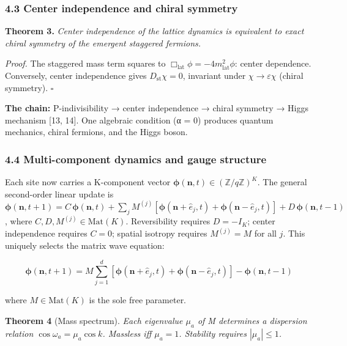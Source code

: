\documentclass[
]{article}
\begin{document}
\hypertarget{center-independence-and-chiral-symmetry}{%
\subsubsection{4.3 Center independence and chiral
symmetry}\label{center-independence-and-chiral-symmetry}}

\textbf{Theorem 3.} \emph{Center independence of the lattice dynamics is
equivalent to exact chiral symmetry of the emergent staggered fermions.}

\emph{Proof.} The staggered mass term squares to
\(\Box_{\text{lat}}\phi = -4m_{\text{lat}}^2\phi\): center dependence.
Conversely, center independence gives \(D_{\text{st}}\chi = 0\),
invariant under \(\chi \to \varepsilon\chi\) (chiral symmetry).
\(\square\)

\textbf{The chain:} P-indivisibility → center independence → chiral
symmetry → Higgs mechanism {[}13, 14{]}. One algebraic condition (α = 0)
produces quantum mechanics, chiral fermions, and the Higgs boson.

\hypertarget{multi-component-dynamics-and-gauge-structure}{%
\subsubsection{4.4 Multi-component dynamics and gauge
structure}\label{multi-component-dynamics-and-gauge-structure}}

Each site now carries a K-component vector
\(\boldsymbol{\phi}(\mathbf{n}, t) \in (\mathbb{Z}/q\mathbb{Z})^K\). The
general second-order linear update is
\(\boldsymbol{\phi}(\mathbf{n}, t+1) = C\,\boldsymbol{\phi}(\mathbf{n}, t) + \sum_j M^{(j)}[\boldsymbol{\phi}(\mathbf{n}+\hat{e}_j, t) + \boldsymbol{\phi}(\mathbf{n}-\hat{e}_j, t)] + D\,\boldsymbol{\phi}(\mathbf{n}, t-1)\),
where \(C, D, M^{(j)} \in \mathrm{Mat}(K)\). Reversibility requires
\(D = -I_K\); center independence requires \(C = 0\); spatial isotropy
requires \(M^{(j)} = M\) for all \(j\). This uniquely selects the matrix
wave equation:

\[\boldsymbol{\phi}(\mathbf{n}, t+1) = M \sum_{j=1}^{d} \left[\boldsymbol{\phi}(\mathbf{n} + \hat{e}_j, t) + \boldsymbol{\phi}(\mathbf{n} - \hat{e}_j, t)\right] - \boldsymbol{\phi}(\mathbf{n}, t-1)\]

where \(M \in \mathrm{Mat}(K)\) is the sole free parameter.

\textbf{Theorem 4} (Mass spectrum). \emph{Each eigenvalue \(\mu_a\) of M
determines a dispersion relation \(\cos\omega_a = \mu_a \cos k\).
Massless iff \(\mu_a = 1\). Stability requires \(|\mu_a| \leq 1\).}
\end{document}

